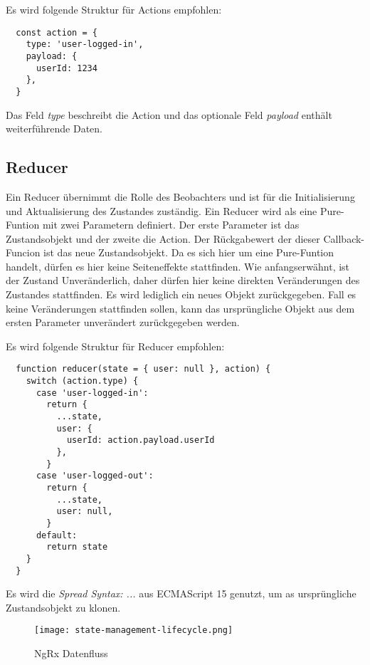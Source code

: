 Es wird folgende Struktur für Actions empfohlen:
\begin{lstlisting}
  const action = {
    type: 'user-logged-in',
    payload: {
      userId: 1234
    },
  }
\end{lstlisting}

Das Feld \textit{type} beschreibt die Action und das optionale Feld \textit{payload} enthält weiterführende Daten.

\subsection{Reducer}

Ein Reducer übernimmt die Rolle des Beobachters und ist für die Initialisierung und Aktualisierung des Zustandes zuständig. Ein Reducer wird als eine Pure-Funtion mit zwei Parametern definiert.
Der erste Parameter ist das Zustandsobjekt und der zweite die Action. Der Rückgabewert der dieser Callback-Funcion ist das neue Zustandsobjekt. Da es sich hier um eine Pure-Funtion handelt, dürfen es hier keine Seiteneffekte stattfinden. Wie anfangserwähnt, ist der Zustand Unveränderlich, daher dürfen hier keine direkten Veränderungen des Zustandes stattfinden. Es wird lediglich ein neues Objekt zurückgegeben. Fall es keine Veränderungen stattfinden sollen, kann das ursprüngliche Objekt aus dem ersten Parameter unverändert zurückgegeben werden.\cite{reduxStateActionReducers}

Es wird folgende Struktur für Reducer empfohlen:
\begin{lstlisting}
  function reducer(state = { user: null }, action) {
    switch (action.type) {
      case 'user-logged-in':
        return {
          ...state,
          user: {
            userId: action.payload.userId
          },
        }
      case 'user-logged-out':
        return {
          ...state,
          user: null,
        }
      default:
        return state
    }
  }
\end{lstlisting}

Es wird die \textit{Spread Syntax: ...} aus ECMAScript 15 genutzt, um as ursprüngliche Zustandsobjekt zu klonen.

\begin{figure}[h!]
\texttt{[image: state-management-lifecycle.png]}
\caption{NgRx Datenfluss}
\end{figure}